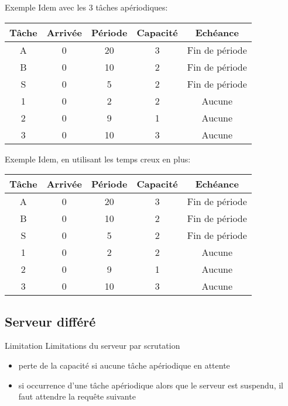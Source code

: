 \begin{frame}{Exemple}
  Idem avec les 3 tâches apériodiques:
  \begin{center}
    \begin{tabular}{ccccc}
      \hline
      Tâche & Arrivée & Période & Capacité & Echéance \\
      \hline
      A & 0 & 20 & 3 & Fin de période\\
      B & 0 & 10 & 2 & Fin de période\\
      S & 0 &  5 & 2 & Fin de période\\
      1 & 0 &  2 & 2 & Aucune\\
      2 & 0 &  9 & 1 & Aucune\\
      3 & 0 & 10 & 3 & Aucune\\
      \hline
    \end{tabular}
  \end{center}

\end{frame} 

\begin{frame}{Exemple}
  Idem, en utilisant les temps creux en plus:
  \begin{center}
    \begin{tabular}{ccccc}
      \hline
      Tâche & Arrivée & Période & Capacité & Echéance \\
      \hline
      A & 0 & 20 & 3 & Fin de période\\
      B & 0 & 10 & 2 & Fin de période\\
      S & 0 &  5 & 2 & Fin de période\\
      1 & 0 &  2 & 2 & Aucune\\
      2 & 0 &  9 & 1 & Aucune\\
      3 & 0 & 10 & 3 & Aucune\\
      \hline
    \end{tabular}
  \end{center}

\end{frame} 

\subsection{Serveur différé}

\begin{frame}{Limitation} 
  Limitations du serveur par scrutation 
  \begin{itemize}
  \item perte de la capacité si aucune tâche apériodique en attente
  \item si occurrence d'une tâche apériodique alors que le serveur est
    suspendu, il faut attendre la requête suivante
  \end{itemize}
\end{frame} 

